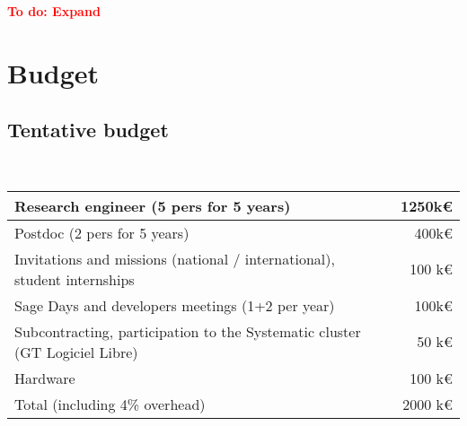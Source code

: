 \documentclass[a4,12pt]{amsart}
\newcommand{\TODO}[2][To do: ]{{\textcolor{red}{\textbf{#1#2}}}}
\begin{document}
\TODO{Expand}



\section{Budget}

\subsection{Tentative budget}
\ \\
\begin{tabular}{|l|r|}\hline
  Research engineer (5 pers for 5 years)                       & 1250k\euro          \\\hline
  Postdoc           (2 pers for 5 years)                       &  400k\euro\\\hline
  Invitations and missions (national / international), student internships & 100 k\euro          \\\hline
  Sage Days and developers meetings (1+2 per year)             & 100k\euro    \\\hline
  Subcontracting, participation to the Systematic cluster (GT Logiciel Libre)  & 50 k\euro\\\hline
  Hardware                                                     & 100 k\euro\\\hline
  Total (including 4\% overhead)                               & 2000 k\euro\\\hline
\end{tabular}


\end{document}
